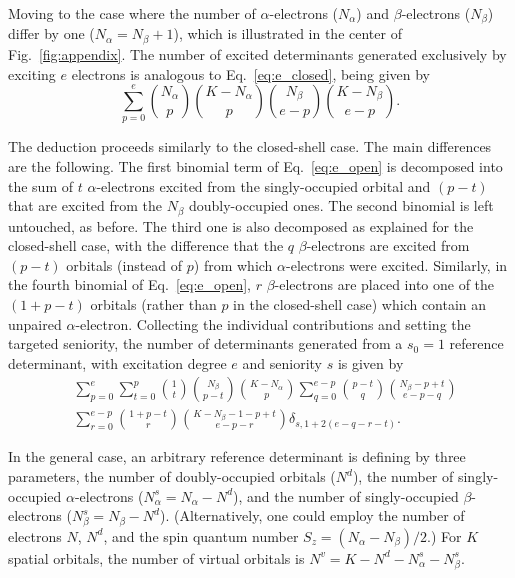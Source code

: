 \documentclass[aip,jcp,reprint,noshowkeys,superscriptaddress]{revtex4-1}
\newcommand{\Na}{N_{\alpha}}
\newcommand{\Nb}{N_{\beta}}
\newcommand{\Nd}{N^{d}}
\newcommand{\Nv}{N^{v}}
\newcommand{\Nas}{N^s_{\alpha}}
\newcommand{\Nbs}{N^s_{\beta}}
\newcommand{\Ndet}{N_\text{det}}
\begin{document}
Moving to the case where the number of $\alpha$-electrons ($\Na$) and $\beta$-electrons ($\Nb$) differ by one ($\Na=\Nb+1$), which is illustrated in the center of Fig.~\ref{fig:appendix}.
The number of excited determinants generated exclusively by exciting $e$ electrons %
is analogous to Eq.~\eqref{eq:e_closed}, being given by
\begin{equation}
\sum_{p=0}^{e} 
\binom{\Na}{p} \binom{K-\Na}{p} \binom{\Nb}{e-p} \binom{K-\Nb}{e-p}.
\label{eq:e_open}
\end{equation}

The deduction proceeds similarly to the closed-shell case. 
The main differences are the following.
The first binomial term of Eq.~\ref{eq:e_open} is decomposed into the sum of $t$ $\alpha$-electrons excited from the singly-occupied orbital and $(p-t)$ that are excited from the $\Nb$ doubly-occupied ones.
The second binomial is left untouched, as before.
The third one is also decomposed as explained for the closed-shell case, with the difference that the $q$ $\beta$-electrons are excited from $(p-t)$ orbitals (instead of $p$) 
from which $\alpha$-electrons were excited. 
Similarly, in the fourth binomial of Eq.~\ref{eq:e_open}, $r$ $\beta$-electrons are placed into one of the $(1+p-t)$ orbitals (rather than $p$ in the closed-shell case) which contain an unpaired $\alpha$-electron.
Collecting the individual contributions and setting the targeted seniority,
the number of determinants generated from a $s_0=1$ reference determinant, with excitation degree $e$ and seniority $s$ is given by
\begin{equation}
\begin{split}
	& \sum_{p=0}^{e} 
	\sum_{t=0}^{p} \binom{1}{t} \binom{\Nb}{p-t} 
	\binom{K-\Na}{p} 
	\sum_{q=0}^{e-p} \binom{p-t}{q} \binom{\Nb-p+t}{e-p-q} \\
	& \sum_{r=0}^{e-p} \binom{1+p-t}{r} \binom{K-\Nb-1-p+t}{e-p-r}
 	\delta_{s,1+2(e-q-r-t)}.
\label{eq:det_2}
\end{split}
\end{equation}

In the general case, an arbitrary reference determinant is defining by three parameters, the number of doubly-occupied orbitals ($\Nd$),
the number of singly-occupied $\alpha$-electrons ($\Nas = \Na - \Nd$),
and the number of singly-occupied $\beta$-electrons ($\Nbs = \Nb - \Nd$).
(Alternatively, one could employ the number of electrons $N$, $\Nd$, and the spin quantum number $S_z = (\Na-\Nb)/2$.)
For $K$ spatial orbitals, the number of virtual orbitals is $\Nv = K - \Nd - \Nas - \Nbs$.
\end{document}
